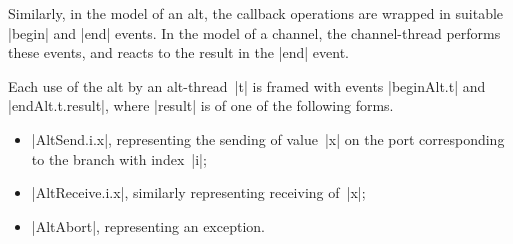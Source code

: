 Similarly, in the model of an alt, the callback operations are wrapped in
suitable |begin| and |end| events.  In the model of a channel, the
channel-thread performs these events, and reacts to the result in the |end|
event.  

Each use of the alt by an alt-thread~|t| is framed with events |beginAlt.t|
and |endAlt.t.result|, where |result| is of one of the following forms.
%
\begin{itemize}
\item |AltSend.i.x|, representing the sending of value~|x| on the port
  corresponding to the branch with index~|i|;

\item |AltReceive.i.x|, similarly representing receiving of~|x|;

\item |AltAbort|, representing an  exception.
\end{itemize}
